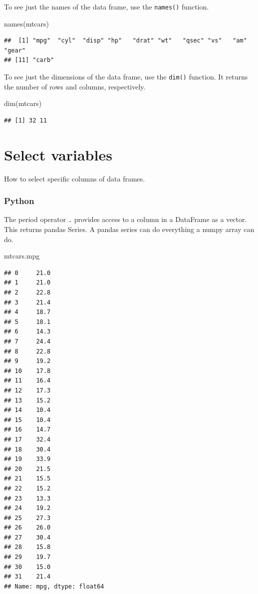 \documentclass[
]{book}
\newenvironment{Shaded}{\begin{snugshade}}{\end{snugshade}}
\newcommand{\FunctionTok}[1]{\textcolor[rgb]{0.00,0.00,0.00}{#1}}
\newcommand{\NormalTok}[1]{#1}
\begin{document}
To see just the names of the data frame, use the \texttt{names()} function.

\begin{Shaded}
\begin{Highlighting}[]
\FunctionTok{names}\NormalTok{(mtcars)}
\end{Highlighting}
\end{Shaded}

\begin{verbatim}
##  [1] "mpg"  "cyl"  "disp" "hp"   "drat" "wt"   "qsec" "vs"   "am"   "gear"
## [11] "carb"
\end{verbatim}

To see just the dimensions of the data frame, use the \texttt{dim()} function. It returns the number of rows and columns, respectively.

\begin{Shaded}
\begin{Highlighting}[]
\FunctionTok{dim}\NormalTok{(mtcars)}
\end{Highlighting}
\end{Shaded}

\begin{verbatim}
## [1] 32 11
\end{verbatim}

\hypertarget{select-variables}{%
\section{Select variables}\label{select-variables}}

How to select specific columns of data frames.

\hypertarget{python-18}{%
\subsubsection*{Python}\label{python-18}}

The period operator \texttt{.} provides access to a column in a DataFrame as a vector. This returns pandas Series. A pandas series can do everything a numpy array can do.

\begin{Shaded}
\begin{Highlighting}[]
\NormalTok{mtcars.mpg}
\end{Highlighting}
\end{Shaded}

\begin{verbatim}
## 0     21.0
## 1     21.0
## 2     22.8
## 3     21.4
## 4     18.7
## 5     18.1
## 6     14.3
## 7     24.4
## 8     22.8
## 9     19.2
## 10    17.8
## 11    16.4
## 12    17.3
## 13    15.2
## 14    10.4
## 15    10.4
## 16    14.7
## 17    32.4
## 18    30.4
## 19    33.9
## 20    21.5
## 21    15.5
## 22    15.2
## 23    13.3
## 24    19.2
## 25    27.3
## 26    26.0
## 27    30.4
## 28    15.8
## 29    19.7
## 30    15.0
## 31    21.4
## Name: mpg, dtype: float64
\end{verbatim}
\end{document}
